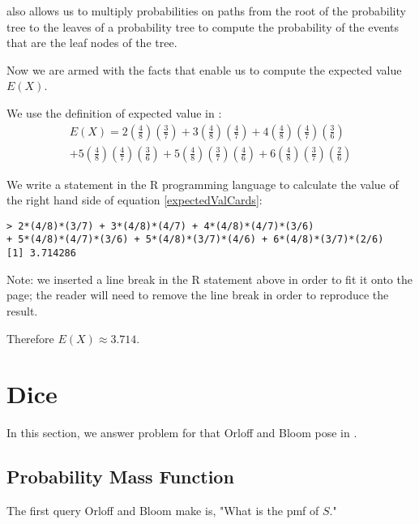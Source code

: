\documentclass[a4paper,11pt]{article}
\begin{document}
\cite{reading3} also allows us to multiply probabilities on paths from
the root of the probability tree to the leaves of a probability tree
to compute the probability of the events that are the leaf nodes of the
tree.

Now we are armed with the facts that enable us to compute the expected
value $E\left( X \right)$.

We use the definition of expected value in \cite{reading4b}:
\begin{equation}\label{expectedValCards}
\begin{split}
  E\left( X \right) = 
    2\left(\frac{4}{8} \right) \left( \frac{3}{7} \right)
  + 3 \left( \frac{4}{8} \right) \left( \frac{4}{7} \right)
  + 4 \left( \frac{4}{8} \right) \left( \frac{4}{7} \right) 
    \left( \frac{3}{6} \right) \\
  + 5 \left( \frac{4}{8} \right) \left( \frac{4}{7} \right)
    \left( \frac{3}{6} \right)
  + 5 \left( \frac{4}{8} \right) \left( \frac{3}{7} \right)
    \left( \frac{4}{6} \right)
  + 6 \left( \frac{4}{8} \right) \left( \frac{3}{7} \right)
    \left( \frac{2}{6} \right)
\end{split}
\end{equation}

We write a statement in the R programming language to calculate 
the value of the right hand side of equation \ref{expectedValCards}:

\begin{lstlisting}
> 2*(4/8)*(3/7) + 3*(4/8)*(4/7) + 4*(4/8)*(4/7)*(3/6) 
+ 5*(4/8)*(4/7)*(3/6) + 5*(4/8)*(3/7)*(4/6) + 6*(4/8)*(3/7)*(2/6)
[1] 3.714286
\end{lstlisting}

Note: we inserted a line break in the R statement above in order to
fit it onto the page; the reader will need to remove the line break
in order to reproduce the result.

Therefore $E \left( X \right) \approx 3.714$.

\section{Dice}
In this section, we answer problem for that Orloff and Bloom pose in
\cite{probSet2}.

\subsection{Probability Mass Function}

The first query Orloff and Bloom make is, "What is the pmf of $S$."
\end{document}
